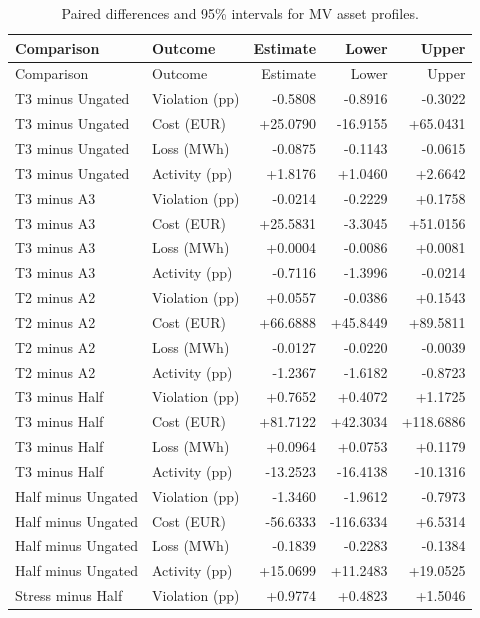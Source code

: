 \documentclass[11pt]{article}
\begin{document}
\small\begin{longtable}{llrrr}
\caption{Paired differences and 95\% intervals for MV asset profiles.}\\\toprule
Comparison & Outcome & Estimate & Lower & Upper\\\midrule
\endfirsthead
\toprule
Comparison & Outcome & Estimate & Lower & Upper\\\midrule
\endhead
\bottomrule\endfoot
T3 minus Ungated & Violation (pp) & -0.5808 & -0.8916 & -0.3022\\
T3 minus Ungated & Cost (EUR) & +25.0790 & -16.9155 & +65.0431\\
T3 minus Ungated & Loss (MWh) & -0.0875 & -0.1143 & -0.0615\\
T3 minus Ungated & Activity (pp) & +1.8176 & +1.0460 & +2.6642\\
T3 minus A3 & Violation (pp) & -0.0214 & -0.2229 & +0.1758\\
T3 minus A3 & Cost (EUR) & +25.5831 & -3.3045 & +51.0156\\
T3 minus A3 & Loss (MWh) & +0.0004 & -0.0086 & +0.0081\\
T3 minus A3 & Activity (pp) & -0.7116 & -1.3996 & -0.0214\\
T2 minus A2 & Violation (pp) & +0.0557 & -0.0386 & +0.1543\\
T2 minus A2 & Cost (EUR) & +66.6888 & +45.8449 & +89.5811\\
T2 minus A2 & Loss (MWh) & -0.0127 & -0.0220 & -0.0039\\
T2 minus A2 & Activity (pp) & -1.2367 & -1.6182 & -0.8723\\
T3 minus Half & Violation (pp) & +0.7652 & +0.4072 & +1.1725\\
T3 minus Half & Cost (EUR) & +81.7122 & +42.3034 & +118.6886\\
T3 minus Half & Loss (MWh) & +0.0964 & +0.0753 & +0.1179\\
T3 minus Half & Activity (pp) & -13.2523 & -16.4138 & -10.1316\\
Half minus Ungated & Violation (pp) & -1.3460 & -1.9612 & -0.7973\\
Half minus Ungated & Cost (EUR) & -56.6333 & -116.6334 & +6.5314\\
Half minus Ungated & Loss (MWh) & -0.1839 & -0.2283 & -0.1384\\
Half minus Ungated & Activity (pp) & +15.0699 & +11.2483 & +19.0525\\
Stress minus Half & Violation (pp) & +0.9774 & +0.4823 & +1.5046\\

\end{longtable}
\end{document}
